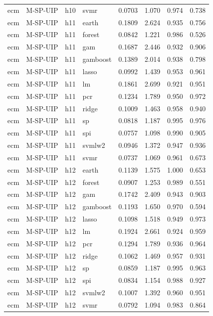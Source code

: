 \begin{ThreePartTable}
\begin{longtable}[t]{llclcccc}
ecm & M-SP-UIP & h10 & svmr & 0.0703 & 1.070 & 0.974 & 0.738\\
\addlinespace
ecm & M-SP-UIP & h11 & earth & 0.1809 & 2.624 & 0.935 & 0.756\\
ecm & M-SP-UIP & h11 & forest & 0.0842 & 1.221 & 0.986 & 0.526\\
ecm & M-SP-UIP & h11 & gam & 0.1687 & 2.446 & 0.932 & 0.906\\
ecm & M-SP-UIP & h11 & gamboost & 0.1389 & 2.014 & 0.938 & 0.798\\
ecm & M-SP-UIP & h11 & lasso & 0.0992 & 1.439 & 0.953 & 0.961\\
ecm & M-SP-UIP & h11 & lm & 0.1861 & 2.699 & 0.921 & 0.951\\
ecm & M-SP-UIP & h11 & pcr & 0.1234 & 1.789 & 0.950 & 0.972\\
ecm & M-SP-UIP & h11 & ridge & 0.1009 & 1.463 & 0.958 & 0.940\\
ecm & M-SP-UIP & h11 & sp & 0.0818 & 1.187 & 0.995 & 0.976\\
ecm & M-SP-UIP & h11 & spi & 0.0757 & 1.098 & 0.990 & 0.905\\
ecm & M-SP-UIP & h11 & svmlw2 & 0.0946 & 1.372 & 0.947 & 0.936\\
ecm & M-SP-UIP & h11 & svmr & 0.0737 & 1.069 & 0.961 & 0.673\\
\addlinespace
ecm & M-SP-UIP & h12 & earth & 0.1139 & 1.575 & 1.000 & 0.653\\
ecm & M-SP-UIP & h12 & forest & 0.0907 & 1.253 & 0.989 & 0.551\\
ecm & M-SP-UIP & h12 & gam & 0.1742 & 2.409 & 0.943 & 0.903\\
ecm & M-SP-UIP & h12 & gamboost & 0.1193 & 1.650 & 0.970 & 0.594\\
ecm & M-SP-UIP & h12 & lasso & 0.1098 & 1.518 & 0.949 & 0.973\\
ecm & M-SP-UIP & h12 & lm & 0.1924 & 2.661 & 0.924 & 0.959\\
ecm & M-SP-UIP & h12 & pcr & 0.1294 & 1.789 & 0.936 & 0.964\\
ecm & M-SP-UIP & h12 & ridge & 0.1062 & 1.469 & 0.957 & 0.931\\
ecm & M-SP-UIP & h12 & sp & 0.0859 & 1.187 & 0.995 & 0.963\\
ecm & M-SP-UIP & h12 & spi & 0.0834 & 1.154 & 0.988 & 0.927\\
ecm & M-SP-UIP & h12 & svmlw2 & 0.1007 & 1.392 & 0.960 & 0.951\\
ecm & M-SP-UIP & h12 & svmr & 0.0792 & 1.094 & 0.983 & 0.864\\

\end{longtable}
\end{ThreePartTable}
